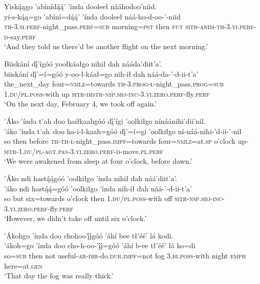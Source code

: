 \ea\label{ex:text9-3-32}
Yiską́ągo ’abínídą́ą́’ ’índa dooleeł nááhodoo’niid.\\
\gll yi-s-ką́ą=go	’abíní=dą́ą́’	’índa	dooleeł	náá-ho-d-oo-’-niid\\
     \textsc{th}-3.\textsc{si}.\textsc{perf}-night\_pass.\textsc{perf}=\textsc{sub}	morning=\textsc{pst}	then	\textsc{fut}	\textsc{sitr}-\textsc{anim}-\textsc{th}-3.\textsc{yi}.\textsc{perf}-\textsc{d}-say.\textsc{perf}\\
\glt `And they told us there'd be another flight on the next morning.'
\z

\ea\label{ex:text9-4-1}
Biiskání dį́’ígóó yoołkáałgo nihił dah nááda’diit’a’.\\
\gll biiskání	dį́’=í=góó	y-oo-ł-káał=go	nih-ił	dah	náá-da-’-d-ii-t’a’\\
     the\_next\_day	four=\textsc{nmlz}=towards	\textsc{th}-3.\textsc{prog}-\textsc{ł}-night\_pass.\textsc{prog}=\textsc{sub}	1.\textsc{du}/\textsc{pl}.\textsc{poss}-with	up	\textsc{sitr}-\textsc{distr}-\textsc{nsp}.\textsc{sbj}-\textsc{inc}-3.\textsc{yi}.\textsc{zero}.\textsc{perf}-fly.\textsc{perf}\\
\glt `On the next day, February 4, we took off again.'
\z

\ea\label{ex:text9-4-2}
’Áko ’índa t’ah doo haiłkaahgóó dį́’ígi ’oolkiłgo nínáánihi’dii’nil.\\
\gll ’áko	’índa	t’ah~{doo}	ha-i-ł-kaah=góó	dį́’=í=gi	’oolkiłgo	ní-náá-nihi-’d-ii-’-nil\\
     so	then	before	\textsc{th}-\textsc{th}-\textsc{ł}-night\_pass.\textsc{impf}=towards	four=\textsc{nmlz}=at.\textsc{sp}	o'clock	up-\textsc{sitr}-1.\textsc{du}/\textsc{pl}-\textsc{agt}.\textsc{pas}-3.\textsc{yi}.\textsc{zero}.\textsc{perf}-\textsc{d}-move.\textsc{pl}.\textsc{perf}\\
\glt `We were awakened from sleep at four o'clock, before dawn.'
\z

\ea\label{ex:text9-4-3}
’Áko ndi hastą́ą́góó ’oolkiłgo ’índa nihił dah náá’diit’a’.\\
\gll ’áko	ndi	hastą́ą́=góó	’oolkiłgo	’índa	nih-ił	dah	náá-’-d-ii-t’a’\\
     so	but	six=towards	o'clock	then	1.\textsc{du}/\textsc{pl}.\textsc{poss}-with	off	\textsc{sitr}-\textsc{nsp}.\textsc{sbj}-\textsc{inc}-3.\textsc{yi}.\textsc{zero}.\textsc{perf}-fly.\textsc{perf}\\
\glt `However, we didn't take off until six o'clock.'
\z

\ea\label{ex:text9-4-4}
’Ákohgo ’índa doo chohoo’į́į́góó ’áhí bee tł’éé’ lá kodi.\\
\gll ’ákoh=go	’índa	doo cho-h-oo-’į́į́=góó	’áhí	b-ee	tł’éé’	lá	ko=di\\
     so=\textsc{sub}	then	not useful-\textsc{ar}-\textsc{dir}-do.\textsc{dur}.\textsc{impf}=not	fog	3.\textsc{bi}.\textsc{poss}-with	night	\textsc{emph}	here=at.\textsc{gen}\\
\glt `That day the fog was really thick.'
\z

